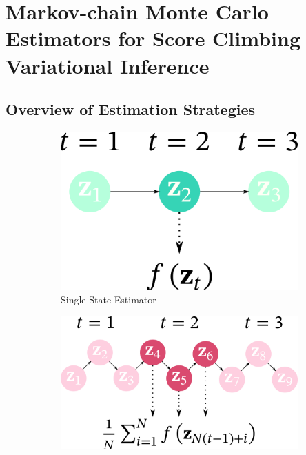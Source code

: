 
\section{Markov-chain Monte Carlo Estimators for Score Climbing Variational Inference}
\vspace{-0.05in}
\subsection{Overview of Estimation Strategies}\label{section:overview}
%
\vspace{-0.05in}

\begin{figure}
    \centering
    \begin{subfigure}[b]{0.25\textwidth}
        \centering
        \includegraphics[scale=0.25]{figures/diagram_1.png}
        \caption{Single State Estimator}\label{fig:single}
    \end{subfigure}
    \begin{subfigure}[b]{0.35\textwidth}
        \centering
        \includegraphics[scale=0.25]{figures/diagram_2.png}

\end{subfigure}
\end{figure}
